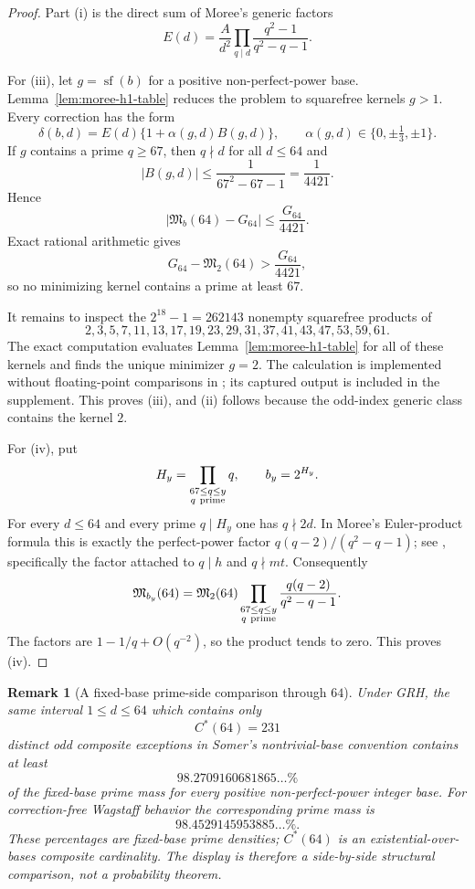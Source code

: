 \documentclass[11pt]{article}
\newtheorem{remark}[theorem]{Remark}
\begin{document}
\begin{proof}
Part (i) is the direct sum of Moree's generic factors
\[
E(d)=\frac{A}{d^2}
\prod_{q\mid d}\frac{q^2-1}{q^2-q-1}.
\]

For (iii), let $g=\operatorname{sf}(b)$ for a positive non-perfect-power base.
Lemma~\ref{lem:moree-h1-table} reduces the problem to squarefree kernels
$g>1$.  Every correction has the form
\[
\delta(b,d)=E(d)\{1+\alpha(g,d)B(g,d)\},
\qquad \alpha(g,d)\in\{0,\pm\tfrac13,\pm1\}.
\]
If $g$ contains a prime $q\ge67$, then $q\nmid d$ for all $d\le64$ and
\[
|B(g,d)|\le\frac1{67^2-67-1}=\frac1{4421}.
\]
Hence
\[
|\mathfrak M_b(64)-G_{64}|\le\frac{G_{64}}{4421}.
\]
Exact rational arithmetic gives
\[
G_{64}-\mathfrak M_2(64)>\frac{G_{64}}{4421},
\]
so no minimizing kernel contains a prime at least $67$.

It remains to inspect the $2^{18}-1=262143$ nonempty squarefree products of
\[
2,3,5,7,11,13,17,19,23,29,31,37,41,43,47,53,59,61.
\]
The exact computation evaluates Lemma~\ref{lem:moree-h1-table} for all of
these kernels and finds the unique minimizer $g=2$.  The calculation is
implemented without floating-point comparisons in
; its captured output is included
in the supplement.  This proves (iii), and (ii) follows because the odd-index
generic class contains the kernel $2$.

For (iv), put
\[
H_y=\prod_{\substack{67\le q\le y\\q\ {\rm prime}}}q,
\qquad b_y=2^{H_y}.
\]
For every $d\le64$ and every prime $q\mid H_y$ one has $q\nmid2d$.
In Moree's Euler-product formula this is exactly the perfect-power factor
$q(q-2)/(q^2-q-1)$; see \cite[Eq.~(8)]{Moree2013}, specifically the factor
attached to $q\mid h$ and $q\nmid mt$.  Consequently
\[
\mathfrak M_{b_y}(64)=\mathfrak M_2(64)
\prod_{\substack{67\le q\le y\\q\ {\rm prime}}}
\frac{q(q-2)}{q^2-q-1}.
\]
The factors are $1-1/q+O(q^{-2})$, so the product tends to zero.  This proves
(iv).
\end{proof}

\begin{remark}[A fixed-base prime-side comparison through $64$]
\label{cor:low-index-separation}
Under GRH, the same interval $1\le d\le64$ which contains only
\[
C^\ast(64)=231
\]
distinct odd composite exceptions in Somer's nontrivial-base convention
contains at least
\[
98.2709160681865\ldots\%
\]
of the fixed-base prime mass for every positive non-perfect-power integer
base.  For correction-free Wagstaff behavior the corresponding prime mass is
\[
98.4529145953885\ldots\%.
\]
These percentages are fixed-base prime densities; $C^\ast(64)$ is an existential-over-bases composite cardinality.  The display is therefore a side-by-side structural comparison, not a probability theorem.
\end{remark}
\end{document}
